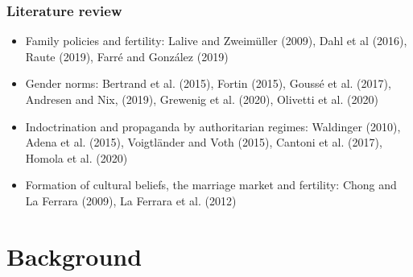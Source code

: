 \documentclass[aspectratio=169]{beamer}
\begin{document}
\begin{frame}
\frametitle{Literature review}
\medskip

\begin{itemize}
\item {\color{blue}Family policies and fertility}: 
Lalive and Zweimüller (2009), Dahl et al (2016), Raute (2019), Farr\'e and Gonz\'alez (2019)
   \medskip  

   \item {\color{blue}Gender norms}: Bertrand et al. (2015), Fortin (2015), Goussé et al. (2017),
Andresen and Nix, (2019), Grewenig et al. (2020), Olivetti et al. (2020)
 
   \medskip

\item {\color{blue}Indoctrination and propaganda by authoritarian regimes}: Waldinger (2010), Adena et al. (2015), Voigtländer and Voth (2015), Cantoni et al. (2017), Homola et al. (2020)
 
\medskip
    \item {\color{blue}Formation of cultural beliefs, the marriage market and fertility}: Chong and La Ferrara (2009), La Ferrara et al. (2012)
  

 
\end{itemize}

\end{frame}

\section{Background}
\end{document}
